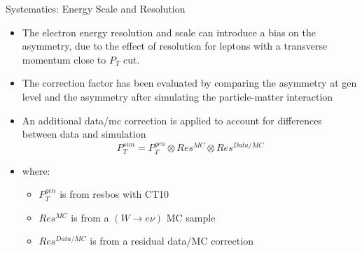 \documentclass[8pt]{beamer}
\begin{document}
\begin{frame}{Systematics: Energy Scale and Resolution}
    \begin{itemize}
      \item The electron energy resolution and scale can introduce a bias on the
      asymmetry, due to the effect of resolution for leptons with a transverse
      momentum close to $P_T$ cut.
      \item The correction factor has been evaluated by comparing the asymmetry at gen level and the asymmetry after simulating the particle-matter interaction
      \item An additional data/mc correction is applied to account for differences between data and simulation
      \begin{equation}
      P_T^{sim} = P_T^{gen} \otimes Res^{MC} \otimes Res^{Data/MC}
      \end{equation}
      \item where:
      \begin{itemize} 
        \item $P_T^{gen}$ is from resbos with CT10
        \item $Res^{MC}$ is from a $(W\to e\nu)$ MC sample
        \item $Res^{Data/MC}$ is from a residual data/MC correction 
      \end{itemize}
    \end{itemize}
\end{frame}
\end{document}

